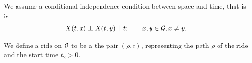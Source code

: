 \documentclass[12pt]{article}
\begin{document}
{{We assume a conditional independence condition between space and time, that is is 
\[X(t, x) \perp X(t, y) \;{\,|\,}\; t; \qquad x,y \in \mathcal{G}, x\neq y.\] 

We define a ride on $\mathcal{G}$ to be a the pair $(\rho, t)$, representing the path $\rho$ of the ride and the start time $t_2>0$.






}}
\end{document}
